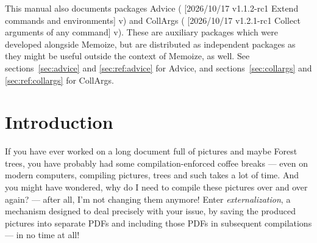 \documentclass[a4paper,11pt]{article}
\begin{document}
\vfill

\begin{tcolorbox}[emph, fontupper=\footnotesize]
  \mmzUnmemoizable
  This manual also documents packages Advice
  ({\ParseProvidesPackage
    [2026/10/17 v1.1.2-rc1 Extend commands and environments]
    v\packagever}) and CollArgs
  ({\ParseProvidesPackage
    [2026/10/17 v1.2.1-rc1 Collect arguments of any command]
    v\packagever}).  These are auxiliary
  packages which were developed alongside Memoize, but are distributed as
  independent packages as they might be useful outside the context of Memoize,
  as well.  See sections~\ref{sec:advice} and \ref{sec:ref:advice} for Advice, and
  sections~\ref{sec:collargs} and \ref{sec:ref:collargs} for CollArgs.
\end{tcolorbox}
\endgroup



\section*{Introduction}
\label{sec:intro}

\begin{tcolorbox}[
    title={\introboxtitle{What} is externalization and why you might want it?},
  ]
  If you have ever worked on a long document full of \TikZ pictures and maybe
  Forest trees, you have probably had some compilation-enforced coffee breaks
  --- even on modern computers, compiling pictures, trees and such takes a lot
  of time.  And you might have wondered, why do I need to compile these
  pictures over and over again? --- after all, I'm not changing them anymore!
  Enter \emph{externalization}, a mechanism designed to deal precisely with
  your issue, by saving the produced pictures into separate PDFs and including
  those PDFs in subsequent compilations --- in no time at all!
\end{tcolorbox}
\end{document}
